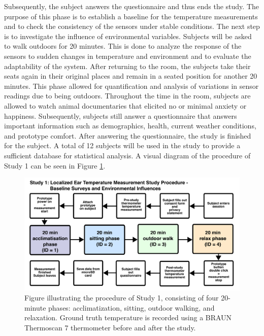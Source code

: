Subsequently, the subject answers the questionnaire and thus ends the study.
The purpose of this phase is to establish a baseline for the temperature measurements and to check the consistency of the sensors under stable conditions.
The next step is to investigate the influence of environmental variables. 
Subjects will be asked to walk outdoors for 20 minutes. 
This is done to analyze the response of the sensors to sudden changes in temperature and environment and to evaluate the adaptability of the system.
After returning to the room, the subjects take their seats again in their original places and remain in a seated position for another 20 minutes. 
This phase allowed for quantification and analysis of variations in sensor readings due to being outdoors.
Throughout the time in the room, subjects are allowed to watch animal documentaries that elicited no or minimal anxiety or happiness. 
Subsequently, subjects still answer a questionnaire that answers important information such as demographics, health, current weather conditions, and prototype comfort.
After answering the questionnaire, the study is finished for the subject.
A total of 12 subjects will be used in the study to provide a sufficient database for statistical analysis.
A visual diagram of the procedure of Study 1 can be seen in Figure \ref{fig:design:study1:procedure}.

\begin{figure}[t]
    \centering
    \includegraphics[width=\textwidth]{thesis-doc/images/study1/Procedure_new.pdf}
    \caption{Figure illustrating the procedure of Study 1, consisting of four 20-minute phases: acclimatization, sitting, outdoor walking, and relaxation. Ground truth temperature is recorded using a BRAUN Thermoscan 7 thermometer before and after the study.}
    \label{fig:design:study1:procedure}
\end{figure}


